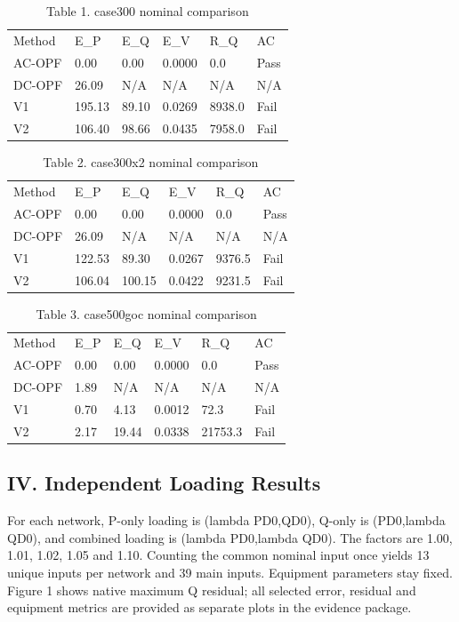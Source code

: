 \documentclass[conference]{IEEEtran}
\begin{document}
\begin{table}[!ht]\centering\caption{Table 1. case300 nominal comparison}\scriptsize
\begin{tabular}{llllll}\toprule
Method & E\_P & E\_Q & E\_V & R\_Q & AC \\
AC-OPF & 0.00 & 0.00 & 0.0000 & 0.0 & Pass \\
DC-OPF & 26.09 & N/A & N/A & N/A & N/A \\
V1 & 195.13 & 89.10 & 0.0269 & 8938.0 & Fail \\
V2 & 106.40 & 98.66 & 0.0435 & 7958.0 & Fail \\
\bottomrule\end{tabular}\end{table}
\begin{table}[!ht]\centering\caption{Table 2. case300x2 nominal comparison}\scriptsize
\begin{tabular}{llllll}\toprule
Method & E\_P & E\_Q & E\_V & R\_Q & AC \\
AC-OPF & 0.00 & 0.00 & 0.0000 & 0.0 & Pass \\
DC-OPF & 26.09 & N/A & N/A & N/A & N/A \\
V1 & 122.53 & 89.30 & 0.0267 & 9376.5 & Fail \\
V2 & 106.04 & 100.15 & 0.0422 & 9231.5 & Fail \\
\bottomrule\end{tabular}\end{table}
\begin{table}[!ht]\centering\caption{Table 3. case500goc nominal comparison}\scriptsize
\begin{tabular}{llllll}\toprule
Method & E\_P & E\_Q & E\_V & R\_Q & AC \\
AC-OPF & 0.00 & 0.00 & 0.0000 & 0.0 & Pass \\
DC-OPF & 1.89 & N/A & N/A & N/A & N/A \\
V1 & 0.70 & 4.13 & 0.0012 & 72.3 & Fail \\
V2 & 2.17 & 19.44 & 0.0338 & 21753.3 & Fail \\
\bottomrule\end{tabular}\end{table}
\subsection*{IV. Independent Loading Results}
For each network, P-only loading is (lambda PD0,QD0), Q-only is (PD0,lambda QD0), and combined loading is (lambda PD0,lambda QD0). The factors are 1.00, 1.01, 1.02, 1.05 and 1.10. Counting the common nominal input once yields 13 unique inputs per network and 39 main inputs. Equipment parameters stay fixed. Figure 1 shows native maximum Q residual; all selected error, residual and equipment metrics are provided as separate plots in the evidence package.
\end{document}
